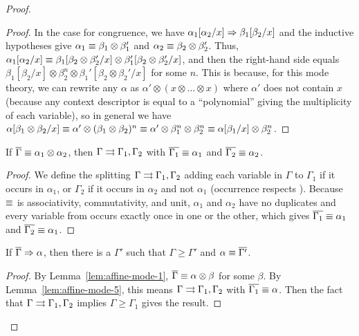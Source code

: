 \begin{proof}
\begin{proof}
In the case for congruence, we have
$\alpha_1[\alpha_2/x] \Rightarrow \beta_1[\beta_2/x]$
and the inductive hypotheses give
    $\alpha_1 \equiv \beta_1 \otimes \beta_1'$
and $\alpha_2 \equiv \beta_2 \otimes \beta_2'$.  
Thus, 
$\alpha_1[\alpha_2/x] \equiv \beta_1[\beta_2 \otimes \beta_2'/x] \otimes \beta_1'[\beta_2 \otimes \beta_2'/x]$,
and then the right-hand side equals 
$\beta_1[\beta_2/x] \otimes \beta_2^n \otimes \beta_1'[\beta_2 \otimes \beta_2'/x]$
for some $n$.  
This is because, 
for this mode theory, we can rewrite any $\alpha$ as $\alpha' \otimes (x
\otimes \ldots \otimes x)$ where $\alpha'$ does not contain $x$ (because
any context descriptor is equal to a ``polynomial'' giving the
multiplicity of each variable), so in general we have $\alpha[\beta_1
  \otimes \beta_2/x] \equiv \alpha' \otimes (\beta_1 \otimes \beta_2)^n
\equiv \alpha' \otimes \beta_1^n \otimes \beta_2^n \equiv \alpha[\beta_1/x]
\otimes \beta_2^n$.
\end{proof}

\begin{lemma} \label{lem:affine-mode-5}
If $\overline{\Gamma} \equiv \alpha_1 \otimes \alpha_2$, 
then $\Gamma \rightrightarrows \Gamma_1,\Gamma_2$ with 
$\overline{\Gamma_1} \equiv \alpha_1$ 
and $\overline{\Gamma_2} \equiv \alpha_2$.  
\end{lemma}
\begin{proof}
We define the splitting $\Gamma \rightrightarrows \Gamma_1,\Gamma_2$ adding each
variable in $\Gamma$ to $\Gamma_1$ if it occurs in $\alpha_1$, or
$\Gamma_2$ if it occurs in $\alpha_2$ and not $\alpha_1$ (occurrence
respects \deq).  Because $\equiv$ is associativity, commutativity, and
unit, $\alpha_1$ and $\alpha_2$ have no duplicates and every variable
from \vars{\Gamma} occurs exactly once in one or the other, which gives
$\overline{\Gamma_1} \equiv \alpha_1$ and $\overline{\Gamma_2} \equiv \alpha_1$.
\end{proof}

\begin{lemma} \label{lem:affine-mode-4}
If $\overline{\Gamma} \Rightarrow \alpha$, then there is a $\Gamma'$ such that
$\Gamma \ge \Gamma'$ and $\alpha \equiv \overline{\Gamma'}$.
\end{lemma}

\begin{proof}
By Lemma~\ref{lem:affine-mode-1}, $\overline{\Gamma} \equiv \alpha \otimes
\beta$ for some $\beta$.  By Lemma~\ref{lem:affine-mode-5}, this means
$\Gamma \rightrightarrows \Gamma_1,\Gamma_2$ with $\overline{\Gamma_1} \equiv \alpha$.
Then the fact that $\Gamma \rightrightarrows \Gamma_1,\Gamma_2$ implies $\Gamma
\ge \Gamma_1$ gives the result.
\end{proof}


\end{proof}
